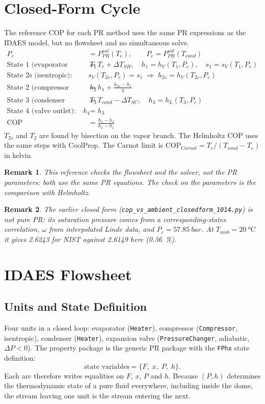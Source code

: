 \documentclass{article}
\newtheorem{remark}{Remark}
\begin{document}
\section{Closed-Form Cycle}\label{sec:closed}
The reference COP for each PR method uses the same PR expressions as the
IDAES model, but no flowsheet and no simultaneous solve.
\begin{align}
P_e &= P^{sat}_{PR}(T_e), \qquad P_c = P^{sat}_{PR}(T_{cond})\\
\text{State 1 (evaporator outlet):}\quad
T_1 &= T_e + \Delta T_{SH}, \quad h_1 = h_V(T_1,P_e),\quad s_1 = s_V(T_1,P_e)\\
\text{State 2s (isentropic):}\quad
&s_V(T_{2s},P_c) = s_1 \;\Rightarrow\; h_{2s} = h_V(T_{2s},P_c)\\
\text{State 2 (compressor outlet):}\quad
h_2 &= h_1 + \frac{h_{2s}-h_1}{\eta}\\
\text{State 3 (condenser outlet):}\quad
T_3 &= T_{cond} - \Delta T_{SC}, \quad h_3 = h_L(T_3,P_c)\\
\text{State 4 (valve outlet):}\quad
h_4 &= h_3\\
\mathrm{COP} &= \frac{h_1 - h_4}{h_2 - h_1}
\end{align}
$T_{2s}$ and $T_2$ are found by bisection on the vapor branch. The Helmholtz
COP uses the same steps with CoolProp. The Carnot limit is
$\mathrm{COP}_{Carnot} = T_e/(T_{cond}-T_e)$ in kelvin.

\begin{remark}
This reference checks the flowsheet and the solver, not the PR parameters:
both use the same PR equations. The check on the parameters is the
comparison with Helmholtz.
\end{remark}

\begin{remark}
The earlier closed form (\texttt{cop\_vs\_ambient\_closedform\_1014.py}) is
not pure PR: its saturation pressure comes from a corresponding-states
correlation, $\omega$ from interpolated Linde data, and $P_c = \SI{57.85}{bar}$.
At $T_{amb}=\SI{20}{\celsius}$ it gives 2.6243 for NIST against 2.6149 here
(\SI{0.36}{\percent}).
\end{remark}

\section{IDAES Flowsheet}
\subsection{Units and State Definition}
Four units in a closed loop: evaporator (\texttt{Heater}), compressor
(\texttt{Compressor}, isentropic), condenser (\texttt{Heater}), expansion valve
(\texttt{PressureChanger}, adiabatic, $\Delta P<0$). The property package is the
generic PR package with the \texttt{FPhx} state definition:
\begin{equation}
\text{state variables} = \{F,\; x,\; P,\; h\}.
\end{equation}
Each arc therefore writes equalities on $F$, $x$, $P$ and $h$. Because
$(P,h)$ determines the thermodynamic state of a pure fluid everywhere,
including inside the dome, the stream leaving one unit is the stream entering
the next.
\end{document}
